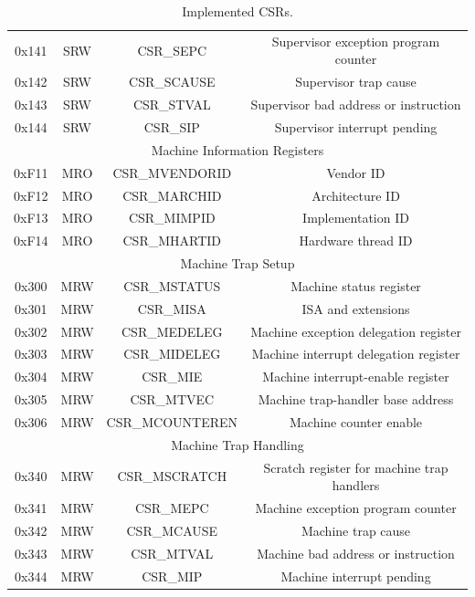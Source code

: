\documentclass[../main.tex]{subfiles}
\begin{document}
\begin{table}[h!]
\begin{tabular}{|c|c|c|c|}
0x141 & SRW & CSR\_SEPC & Supervisor exception program counter\\
0x142 & SRW & CSR\_SCAUSE & Supervisor trap cause\\
0x143 & SRW & CSR\_STVAL & Supervisor bad address or instruction\\
0x144 & SRW & CSR\_SIP & Supervisor interrupt pending\\
\hline
\multicolumn{4}{|c|}{Machine Information Registers}\\
\hline
0xF11 & MRO & CSR\_MVENDORID & Vendor ID \\ 
0xF12 & MRO & CSR\_MARCHID & Architecture ID \\ 
0xF13 & MRO & CSR\_MIMPID &  Implementation ID\\ 
0xF14 & MRO & CSR\_MHARTID & Hardware thread ID\\
\hline
\multicolumn{4}{|c|}{Machine Trap Setup}\\
\hline
0x300 & MRW & CSR\_MSTATUS & Machine status register\\
0x301 & MRW & CSR\_MISA & ISA and extensions\\
0x302 & MRW & CSR\_MEDELEG & Machine exception delegation register\\
0x303 & MRW & CSR\_MIDELEG & Machine interrupt delegation register\\
0x304 & MRW & CSR\_MIE & Machine interrupt-enable register\\
0x305 & MRW & CSR\_MTVEC & Machine trap-handler base address\\
0x306 & MRW & CSR\_MCOUNTEREN & Machine counter enable\\
\hline
\multicolumn{4}{|c|}{Machine Trap Handling}\\
\hline
0x340 & MRW & CSR\_MSCRATCH & Scratch register for machine trap handlers\\
0x341 & MRW & CSR\_MEPC & Machine exception program counter\\
0x342 & MRW & CSR\_MCAUSE & Machine trap cause\\
0x343 & MRW & CSR\_MTVAL & Machine bad address or instruction\\
0x344 & MRW & CSR\_MIP & Machine interrupt pending\\
\hline
\end{tabular}
\caption{Implemented CSRs.}
\label{tab:CSRs}
\end{table}
\end{document}
